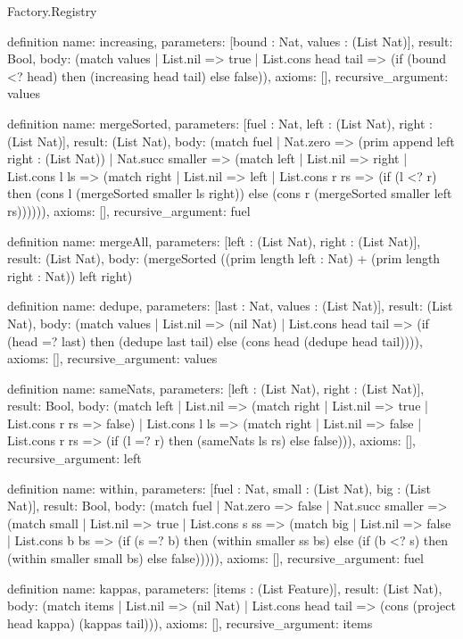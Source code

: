 \begin{lexlean}{Factory.Registry}
\begin{semanticmodule}
definition{
  name: increasing,
  parameters: [bound : Nat, values : (List Nat)],
  result: Bool,
  body: (match values
    | List.nil => true
    | List.cons head tail => (if (bound <? head) then (increasing head tail) else false)),
  axioms: [],
  recursive_argument: values
}

definition{
  name: mergeSorted,
  parameters: [fuel : Nat, left : (List Nat), right : (List Nat)],
  result: (List Nat),
  body: (match fuel
    | Nat.zero => (prim append left right : (List Nat))
    | Nat.succ smaller => (match left
      | List.nil => right
      | List.cons l ls => (match right
        | List.nil => left
        | List.cons r rs => (if (l <? r) then (cons l (mergeSorted smaller ls right)) else (cons r (mergeSorted smaller left rs)))))),
  axioms: [],
  recursive_argument: fuel
}

definition{
  name: mergeAll,
  parameters: [left : (List Nat), right : (List Nat)],
  result: (List Nat),
  body: (mergeSorted ((prim length left : Nat) + (prim length right : Nat)) left right)
}

definition{
  name: dedupe,
  parameters: [last : Nat, values : (List Nat)],
  result: (List Nat),
  body: (match values
    | List.nil => (nil Nat)
    | List.cons head tail => (if (head =? last) then (dedupe last tail) else (cons head (dedupe head tail)))),
  axioms: [],
  recursive_argument: values
}

definition{
  name: sameNats,
  parameters: [left : (List Nat), right : (List Nat)],
  result: Bool,
  body: (match left
    | List.nil => (match right | List.nil => true | List.cons r rs => false)
    | List.cons l ls => (match right
      | List.nil => false
      | List.cons r rs => (if (l =? r) then (sameNats ls rs) else false))),
  axioms: [],
  recursive_argument: left
}

definition{
  name: within,
  parameters: [fuel : Nat, small : (List Nat), big : (List Nat)],
  result: Bool,
  body: (match fuel
    | Nat.zero => false
    | Nat.succ smaller => (match small
      | List.nil => true
      | List.cons s ss => (match big
        | List.nil => false
        | List.cons b bs => (if (s =? b) then (within smaller ss bs) else (if (b <? s) then (within smaller small bs) else false))))),
  axioms: [],
  recursive_argument: fuel
}

definition{
  name: kappas,
  parameters: [items : (List Feature)],
  result: (List Nat),
  body: (match items
    | List.nil => (nil Nat)
    | List.cons head tail => (cons (project head kappa) (kappas tail))),
  axioms: [],
  recursive_argument: items
}


\end{semanticmodule}
\end{lexlean}
